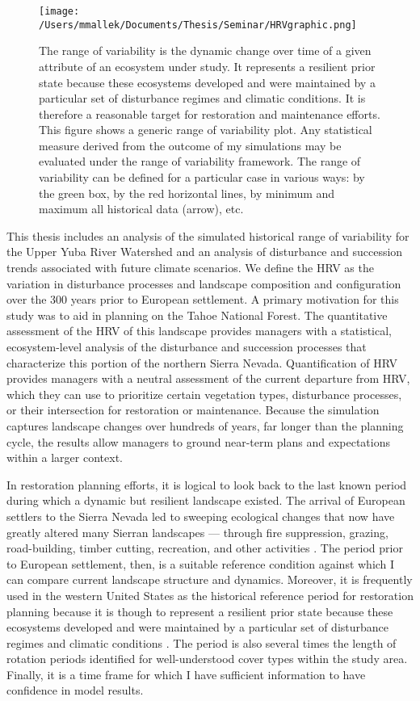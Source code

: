 \begin{figure}[!htbp]
\centering
\texttt{[image: /Users/mmallek/Documents/Thesis/Seminar/HRVgraphic.png]}
\caption{The range of variability is the dynamic change over time of a given attribute of an ecosystem under study. It represents a resilient prior state because these ecosystems developed and were maintained by a particular set of disturbance regimes and climatic conditions. It is therefore a reasonable target for restoration and maintenance efforts. This figure shows a generic range of variability plot. Any statistical measure derived from the outcome of my simulations may be evaluated under the range of variability framework. The range of variability can be defined for a particular case in various ways: by the green box, by the red horizontal lines, by minimum and maximum all historical data (arrow), etc.
}
\label{fig:hrvplot}
\end{figure}

This thesis includes an analysis of the simulated historical range of variability for the Upper Yuba River Watershed and an analysis of disturbance and succession trends associated with future climate scenarios. We define the HRV as the variation in disturbance processes and landscape composition and configuration over the 300 years prior to European settlement. A primary motivation for this study was to aid in planning on the Tahoe National Forest. The quantitative assessment of the HRV of this landscape provides managers with a statistical, ecosystem-level analysis of the disturbance and succession processes that characterize this portion of the northern Sierra Nevada. Quantification of HRV provides managers with a neutral assessment of the current departure from HRV, which they can use to prioritize certain vegetation types, disturbance processes, or their intersection for restoration or maintenance. Because the simulation captures landscape changes over hundreds of years, far longer than the planning cycle, the results allow managers to ground near-term plans and expectations within a larger context. 

In restoration planning efforts, it is logical to look back to the last known period during which a dynamic but resilient landscape existed. The arrival of European settlers to the Sierra Nevada led to sweeping ecological changes that now have greatly altered many Sierran landscapes --- through fire suppression, grazing, road-building, timber cutting, recreation, and other activities \citep{Storer1963,Stephens2015,Knapp2013,Hessburg2005}. The period prior to European settlement, then, is a suitable reference condition against which I can compare current landscape structure and dynamics. Moreover, it is frequently used in the western United States as the historical reference period for restoration planning because it is though to represent a resilient prior state because these ecosystems developed and were maintained by a particular set of disturbance regimes and climatic conditions \citep{VandeWater2011,Safford2013,Meyer2013}. The period is also several times the length of rotation periods identified for well-understood cover types within the study area. Finally, it is a time frame for which I have sufficient information to have confidence in model results. 

